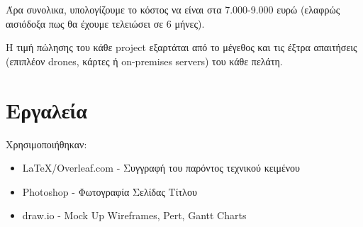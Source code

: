 \documentclass{article}
\begin{document}
Άρα συνολικα, υπολογίζουμε το κόστος να είναι στα 7.000-9.000 ευρώ (ελαφρώς αισιόδοξα πως θα έχουμε τελειώσει σε 6 μήνες).

Η τιμή πώλησης του κάθε project εξαρτάται από το μέγεθος και τις έξτρα απαιτήσεις (επιπλέον drones, κάρτες ή on-premises servers) του κάθε πελάτη.

\section{Εργαλεία}
Χρησιμοποιήθηκαν:
\begin{itemize}
    \item \LaTeX/Overleaf.com - Συγγραφή του παρόντος τεχνικού κειμένου
    \item Photoshop - Φωτογραφία Σελίδας Τίτλου
    \item draw.io - Mock Up Wireframes, Pert, Gantt Charts
\end{itemize}
\end{document}
